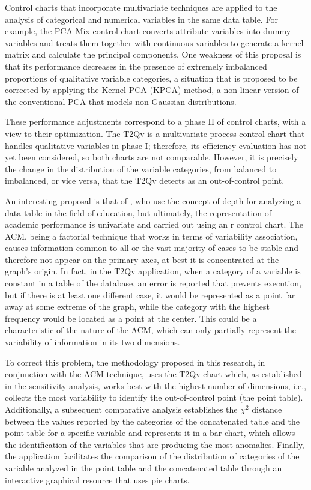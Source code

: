 \documentclass[mathematics,article,submit,moreauthors,pdftex]{mdpi}
\begin{document}
Control charts that incorporate multivariate techniques are applied to
the analysis of categorical and numerical variables in the same data
table. For example, the PCA Mix control chart \citep{Ahsan2020} converts
attribute variables into dummy variables and treats them together with
continuous variables to generate a kernel matrix and calculate the
principal components. One weakness of this proposal is that its
performance decreases in the presence of extremely imbalanced
proportions of qualitative variable categories, a situation that is
proposed to be corrected by applying the Kernel PCA (KPCA) method, a
non-linear version of the conventional PCA that models non-Gaussian
distributions.

These performance adjustments correspond to a phase II of control
charts, with a view to their optimization. The T2Qv is a multivariate
process control chart that handles qualitative variables in phase I;
therefore, its efficiency evaluation has not yet been considered, so
both charts are not comparable. However, it is precisely the change in
the distribution of the variable categories, from balanced to
imbalanced, or vice versa, that the T2Qv detects as an out-of-control
point.

An interesting proposal is that of \citet{Saltos2020}, who use the
concept of depth for analyzing a data table in the field of education,
but ultimately, the representation of academic performance is univariate
and carried out using an r control chart. The ACM, being a factorial
technique that works in terms of variability association, causes
information common to all or the vast majority of cases to be stable and
therefore not appear on the primary axes, at best it is concentrated at
the graph's origin. In fact, in the T2Qv application, when a category of
a variable is constant in a table of the database, an error is reported
that prevents execution, but if there is at least one different case, it
would be represented as a point far away at some extreme of the graph,
while the category with the highest frequency would be located as a
point at the center. This could be a characteristic of the nature of the
ACM, which can only partially represent the variability of information
in its two dimensions.

To correct this problem, the methodology proposed in this research, in
conjunction with the ACM technique, uses the T2Qv chart which, as
established in the sensitivity analysis, works best with the highest
number of dimensions, i.e., collects the most variability to identify
the out-of-control point (the point table). Additionally, a subsequent
comparative analysis establishes the \(\chi^{2}\) distance between the
values reported by the categories of the concatenated table and the
point table for a specific variable and represents it in a bar chart,
which allows the identification of the variables that are producing the
most anomalies. Finally, the application facilitates the comparison of
the distribution of categories of the variable analyzed in the point
table and the concatenated table through an interactive graphical
resource that uses pie charts.
\end{document}
